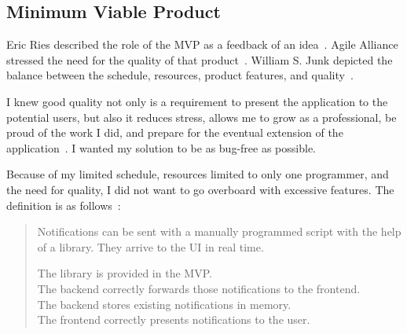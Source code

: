 \subsection{Minimum Viable Product}\label{sec:minimum-viable-product}

Eric Ries described the role of the \ac{MVP}
as a feedback of an idea~\cite{ries_lean_2011}.
Agile Alliance stressed the need
for the quality of that product~\cite{foster_mvp_2022}.
William S. Junk depicted the balance between
the schedule,
resources,
product features,
and quality~\cite{junk_dynamic_2000}.

I knew good quality not only is a requirement
to present the application to the potential users,
but also it reduces stress,
allows me to grow as a professional,
be proud of the work I did,
and prepare for the eventual extension
of the application~\cite{beck_extreme_2004,foster_mvp_2022,martin_clean_2011}.
I wanted my solution to be
as bug-free as possible.

Because of my limited schedule,
resources limited to only one programmer,
and the need for quality,
I did not want to go overboard
with excessive features.
The definition is as follows~\cite{sewera_mvp_2022}:

\begin{quote}
  Notifications can be sent with a manually programmed script
  with the help of a library.
  They arrive to the \ac{UI} in real time.

  The library is provided in the \ac{MVP}.\\
  The backend correctly forwards those notifications to the frontend.\\
  The backend stores existing notifications in memory.\\
  The frontend correctly presents notifications to the user.
\end{quote}
